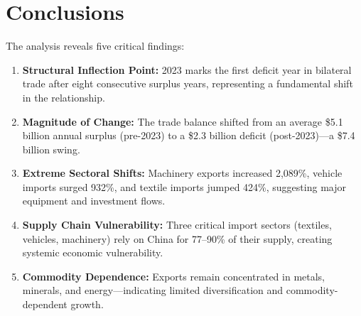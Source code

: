 \documentclass[12pt]{article}
\begin{document}
\section{Conclusions}

The analysis reveals five critical findings:

\begin{enumerate}
\item \textbf{Structural Inflection Point:} 2023 marks the first deficit year in bilateral trade after eight consecutive surplus years, representing a fundamental shift in the relationship.

\item \textbf{Magnitude of Change:} The trade balance shifted from an average \$5.1 billion annual surplus (pre-2023) to a \$2.3 billion deficit (post-2023)---a \$7.4 billion swing.

\item \textbf{Extreme Sectoral Shifts:} Machinery exports increased 2,089\%, vehicle imports surged 932\%, and textile imports jumped 424\%, suggesting major equipment and investment flows.

\item \textbf{Supply Chain Vulnerability:} Three critical import sectors (textiles, vehicles, machinery) rely on China for 77--90\% of their supply, creating systemic economic vulnerability.

\item \textbf{Commodity Dependence:} Exports remain concentrated in metals, minerals, and energy---indicating limited diversification and commodity-dependent growth.
\end{enumerate}
\end{document}

